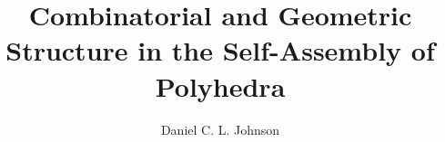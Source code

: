 \documentclass[12pt]{report}   %
\title{Combinatorial and Geometric Structure in the Self-Assembly of Polyhedra
}
\author{Daniel C. L. Johnson}
\begin{document}
\maketitle



%  

%  

%  

%
%



\newtheorem{mythm}{Theorem}
\newtheorem{mylem}{Lemma}
\newtheorem{mycor}{Corollary}
\newtheorem{mydef}{Definition}
\newtheorem{mycon}{Conjecture}

\newcommand{\colorA}{white}
\newcommand{\colorB}{black}
\newcommand{\colorAsm}{w}
\newcommand{\colorBsm}{b}
\newcommand{\poly}{$\mathscr{P}$}
\newcommand{\Poly}{\mathscr{P}}
\newcommand{\PolyGraph}{\textswab{G}}
\newcommand{\faceset}{F\left(\mathscr{P}\right)}
\newcommand{\spc}{ }
\newcommand{\xj}{$x^j$}
\newcommand{\xk}{$x^k$}
\newcommand{\Sjk}{$S_{jk}$}
\newcommand{\Skj}{$S_{kj}$}
\newcommand{\G}{{G}}
\end{document}
